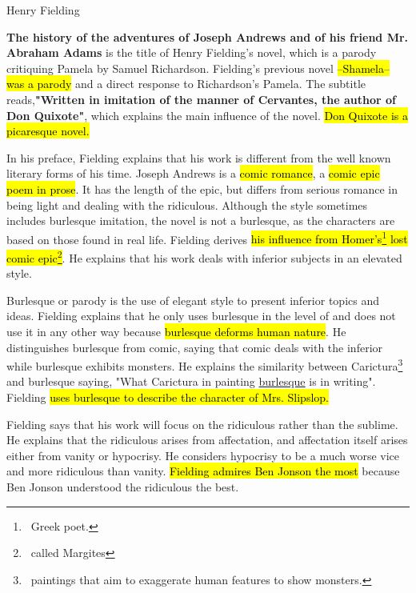 \documentclass[12pt, a4paper]{article}
\begin{document}

\enlargethispage{\baselineskip}
\titlehead{Joseph Andrews}{Henry Fielding}



\ind \textbf{The history of the adventures of Joseph Andrews and of his friend Mr. Abraham Adams} is the 
title of Henry Fielding's novel, which is a parody critiquing Pamela by Samuel Richardson.
Fielding's previous novel \hl{--Shamela-- was a parody} and a direct response to Richardson's Pamela.
The subtitle reads,\textbf{"Written in imitation of the manner of Cervantes,
the author of Don Quixote"}, which explains the main influence of the novel. \hl{Don Quixote is a picaresque
novel.} 


\ind In his preface, Fielding explains that his work is different from the well known
literary forms of his time. Joseph Andrews is a \hl{comic romance}, a \hl{comic epic
poem in prose}. It has the length of the epic, but differs from serious romance
in being light and dealing with the ridiculous. Although the style sometimes 
includes burlesque  imitation, the novel is not a burlesque, as the characters are
based on those found in real life. Fielding derives \hl{his influence from Homer's\footnote{
\, Greek poet.} lost comic epic\footnote{\, called Margites}}. He explains that his work deals with inferior subjects
in an elevated style.


\ind Burlesque or parody is the use of elegant style to present inferior topics and ideas. 
Fielding explains that he only uses burlesque in the level of 
and does not use it in any other way because \hl{burlesque deforms human nature}. He 
distinguishes burlesque from comic, saying that comic deals with the inferior while
burlesque exhibits monsters. He
explains the similarity between Carictura\footnote{\, paintings that aim to
exaggerate human features to show monsters.} and burlesque saying,
"What Carictura in painting \underline{burlesque} is in writing". Fielding \hl{uses
burlesque to describe the character of Mrs. Slipslop.}



\ind Fielding says that his work will focus on the ridiculous rather than the sublime.
He explains that the ridiculous arises from affectation, and 
affectation itself arises either from vanity or hypocrisy.
He considers hypocrisy to be a much worse vice and more ridiculous than vanity.
\hl{Fielding admires Ben Jonson the most} because Ben Jonson understood the ridiculous the best.
\end{document}
